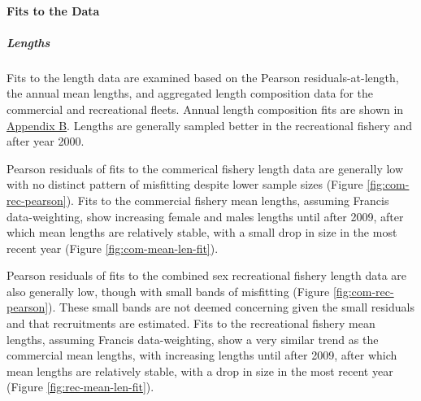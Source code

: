 \documentclass[11pt,
  english,
  a4paper,
]{article}
\begin{document}
\leavevmode\tagmcend\tagstructend\par


\hypertarget{fits-to-the-data}{%
\paragraph{Fits to the Data}\label{fits-to-the-data}}

\leavevmode\tagmcend\tagstructend


\hypertarget{lengths-2}{%
\subparagraph{Lengths}\label{lengths-2}}

\leavevmode\tagmcend\tagstructend


Fits to the length data are examined based on the Pearson residuals-at-length, the annual mean lengths, and aggregated length composition data for the commercial and recreational fleets. Annual length composition fits are shown in {\protect\hyperlink{append_a}{Appendix B}\leavevmode\tagmcend\tagstructend}. Lengths are generally sampled better in the recreational fishery and after year 2000.

\leavevmode\tagmcend\tagstructend\par


Pearson residuals of fits to the commerical fishery length data are generally low with no distinct pattern of misfitting despite lower sample sizes (Figure \ref{fig:com-rec-pearson}). Fits to the commercial fishery mean lengths, assuming Francis data-weighting, show increasing female and males lengths until after 2009, after which mean lengths are relatively stable, with a small drop in size in the most recent year (Figure \ref{fig:com-mean-len-fit}).

\leavevmode\tagmcend\tagstructend\par


Pearson residuals of fits to the combined sex recreational fishery length data are also generally low, though with small bands of misfitting (Figure \ref{fig:com-rec-pearson}). These small bands are not deemed concerning given the small residuals and that recruitments are estimated. Fits to the recreational fishery mean lengths, assuming Francis data-weighting, show a very similar trend as the commercial mean lengths, with increasing lengths until after 2009, after which mean lengths are relatively stable, with a drop in size in the most recent year (Figure \ref{fig:rec-mean-len-fit}).
\end{document}
